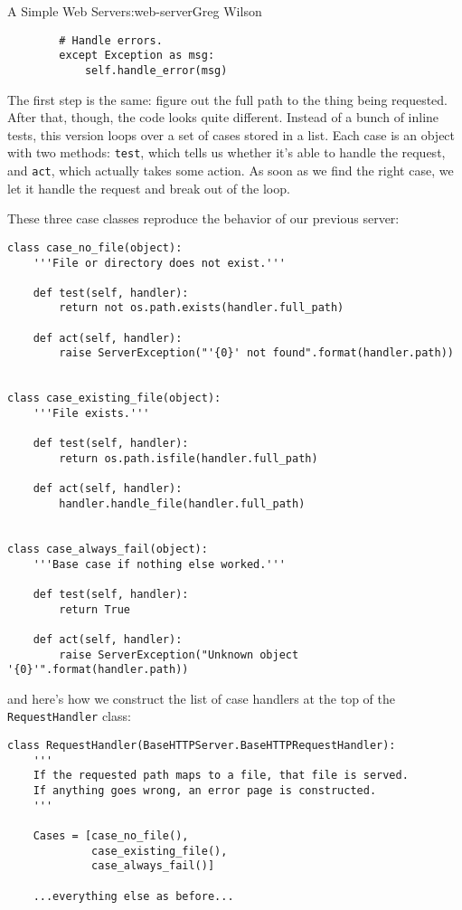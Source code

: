 \begin{aosachapter}{A Simple Web Server}{s:web-server}{Greg Wilson}
\begin{verbatim}
        # Handle errors.
        except Exception as msg:
            self.handle_error(msg)
\end{verbatim}

The first step is the same: figure out the full path to the thing being
requested. After that, though, the code looks quite different. Instead
of a bunch of inline tests, this version loops over a set of cases
stored in a list. Each case is an object with two methods:
\texttt{test}, which tells us whether it's able to handle the request,
and \texttt{act}, which actually takes some action. As soon as we find
the right case, we let it handle the request and break out of the loop.

These three case classes reproduce the behavior of our previous server:

\begin{verbatim}
class case_no_file(object):
    '''File or directory does not exist.'''

    def test(self, handler):
        return not os.path.exists(handler.full_path)

    def act(self, handler):
        raise ServerException("'{0}' not found".format(handler.path))


class case_existing_file(object):
    '''File exists.'''

    def test(self, handler):
        return os.path.isfile(handler.full_path)

    def act(self, handler):
        handler.handle_file(handler.full_path)


class case_always_fail(object):
    '''Base case if nothing else worked.'''

    def test(self, handler):
        return True

    def act(self, handler):
        raise ServerException("Unknown object '{0}'".format(handler.path))
\end{verbatim}

and here's how we construct the list of case handlers at the top of the
\texttt{RequestHandler} class:

\begin{verbatim}
class RequestHandler(BaseHTTPServer.BaseHTTPRequestHandler):
    '''
    If the requested path maps to a file, that file is served.
    If anything goes wrong, an error page is constructed.
    '''

    Cases = [case_no_file(),
             case_existing_file(),
             case_always_fail()]

    ...everything else as before...
\end{verbatim}


\end{aosachapter}
